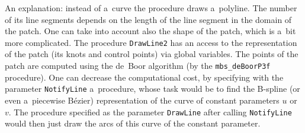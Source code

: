 \vspace{\medskipamount}
\vspace{\medskipamount}
 
An explanation: instead of a~curve the procedure draws a~polyline.
The number of its line segments depends on the length of the line segment
in the domain of the patch. One can take into account also the shape
of the patch, which is a~bit more complicated. The procedure
\texttt{DrawLine2} has an access to the representation of the patch
(its knots and control points) via global variables. The points of the patch
are computed using the de~Boor algorithm (by the \texttt{mbs\_deBoorP3f}
procedure). One can decrease the computational cost, by specifying with
the parameter \texttt{NotifyLine} a~procedure, whose task would be to
find the B-spline (or even a~piecewise B\'{e}zier) representation of the
curve of constant parameters $u$ or $v$. The procedure specified as
the parameter \texttt{DrawLine} after calling \texttt{NotifyLine}
would then just draw the arcs of this curve of the constant parameter.

